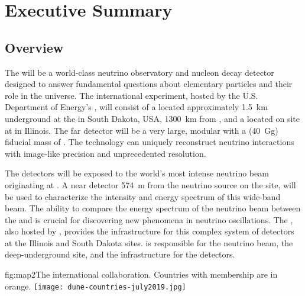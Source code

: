 \chapter{Executive Summary}
\label{ch:exec-overall}

\section{Overview}
\label{sec:exec-overall-1}

The  will be a world-class neutrino observatory and nucleon decay detector designed to answer fundamental questions about elementary particles and their role in the universe. The international  experiment, hosted by the U.S. Department of Energy's , will consist of a  located approximately \SI{1.5}{km} underground at the  in South Dakota, USA, \SI{1300}{\km} from , and a  located on site at  in Illinois. The far detector will be a very large, modular  with a \fdfiducialmass (\SI{40}{\giga\gram}) fiducial mass of . The  technology 
can uniquely reconstruct neutrino interactions with image-like precision and unprecedented resolution. 

The  detectors will be exposed to the world's most intense neutrino beam originating at . A near detector \SI{574}{m} from the neutrino source on the  site, will be used to characterize the intensity and energy spectrum of this wide-band beam. The ability to compare the energy spectrum of the neutrino beam between the  and 
is crucial for discovering new phenomena in neutrino oscillations. The , also hosted by , provides the infrastructure for this complex system of detectors at the Illinois and South Dakota sites.  is responsible for the neutrino beam, the deep-underground site, and the infrastructure for the  detectors. 

\begin{dunefigure}{fig:map2}{The international 
collaboration. Countries with  membership are in orange.}
\texttt{[image: dune-countries-july2019.jpg]}  
\end{dunefigure} %

